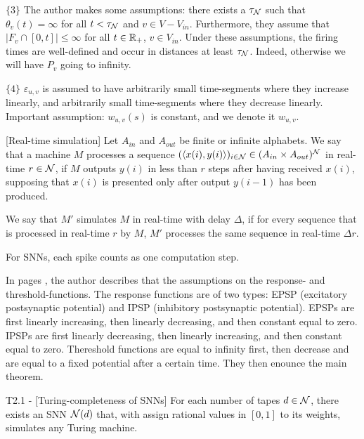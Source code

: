\documentclass{article}
\begin{document}
$\{3\}$ The author makes some assumptions: there exists a $\tau_{\mathcal{N}}$ such that $\theta_v(t) = \infty$ for all $t < \tau_{\mathcal{N}}$ and $v \in V - V_{in}$. Furthermore, they assume that $|F_v \cap [0,t]| \leq \infty$ for all $t \in \mathbb{R}_+$, $v \in V_{in}$.
Under these assumptions, the firing times are well-defined and occur in distances at least $\tau_{\mathcal{N}}$. Indeed, otherwise we will have $P_v$ going to infinity.

$\{4\}$ $\varepsilon_{u,v}$ is assumed to have arbitrarily small time-segments where they increase linearly, and arbitrarily small time-segments where they decrease linearly.  Important assumption: $w_{u,v}(s)$ is constant, and we denote it $w_{u,v}$.

\begin{flexidefinition}{}[Real-time simulation]
    Let $A_{in}$ and $A_{out}$ be finite or infinite alphabets. We say that a machine $M$ processes a sequence $(\langle x(i), y(i) \rangle)_{i \in \mathcal{N}} \in (A_{in} \times A_{out})^{\mathcal{N}}$ in real-time $r \in \mathcal{N}$, if $M$ outputs $y(i)$ in less than $r$ steps after having received $x(i)$, supposing that $x(i)$ is presented only after output $y(i-1)$ has been produced. 
    
    We say that $M'$ simulates $M$ in real-time with delay $\Delta$, if for every sequence that is processed in real-time $r$ by $M$, $M'$ processes the same sequence in real-time $\Delta r$.
    
    For SNNs, each spike counts as one computation step.
\end{flexidefinition}

In pages , the author describes that the assumptions on the response- and threshold-functions. The response functions are of two types: EPSP (excitatory postsynaptic potential) and IPSP (inhibitory postsynaptic potential). EPSPs are first linearly increasing, then linearly decreasing, and then constant equal to zero.  IPSPs are first linearly decreasing, then linearly increasing, and then constant equal to zero. Thereshold functions are equal to infinity first, then decrease and are equal to a fixed potential after a certain time. They then enounce the main theorem.

\begin{flexitheorem}{T2.1 - }[Turing-completeness of SNNs]
    For each number of tapes $d \in \mathcal{N}$, there exists an SNN $\mathcal{N}(d)$ that, with assign rational values in $[0,1]$ to its weights, simulates any Turing machine.
\end{flexitheorem}
\end{document}

